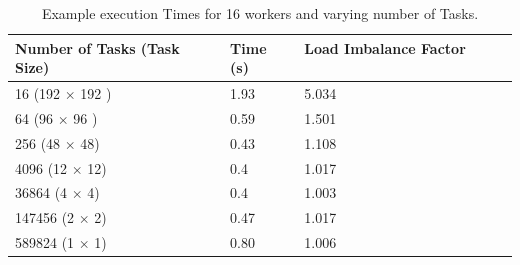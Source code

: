 \documentclass{article}
\begin{document}
\begin{table}[h]
\begin{center}
\begin{tabular}{ | l | l | l | l | l | }
\hline
	Number of Tasks (Task Size)  & Time (s) & Load Imbalance Factor \  \\ \hline
        16 (192 $\times $ 192 ) & 1.93 & 5.034  \\ \hline
	64 (96 $\times$ 96 ) & 0.59 & 1.501 \\ \hline
	256 (48 $\times$ 48) & 0.43 & 1.108  \\ \hline
	4096 (12 $\times$ 12) & 0.4 & 1.017 \\ \hline
	36864 (4 $\times$ 4) & 0.4 & 1.003  \\ \hline
	147456 (2 $\times$ 2) & 0.47 & 1.017 \\ \hline
	589824 (1 $\times$ 1) & 0.80 & 1.006 \\ \hline
        \end{tabular}
        \caption{Example execution Times for 16 workers and varying number of Tasks.}
	 \end{center}
	 \end{table}
\end{document}
